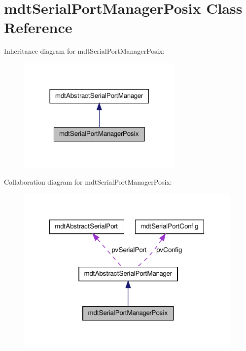 \hypertarget{classmdt_serial_port_manager_posix}{
\section{mdtSerialPortManagerPosix Class Reference}
\label{classmdt_serial_port_manager_posix}
}


Inheritance diagram for mdtSerialPortManagerPosix:\nopagebreak
\begin{figure}[H]
\begin{center}
\leavevmode
\includegraphics[width=230pt]{classmdt_serial_port_manager_posix__inherit__graph}
\end{center}
\end{figure}


Collaboration diagram for mdtSerialPortManagerPosix:\nopagebreak
\begin{figure}[H]
\begin{center}
\leavevmode
\includegraphics[width=314pt]{classmdt_serial_port_manager_posix__coll__graph}
\end{center}
\end{figure}
